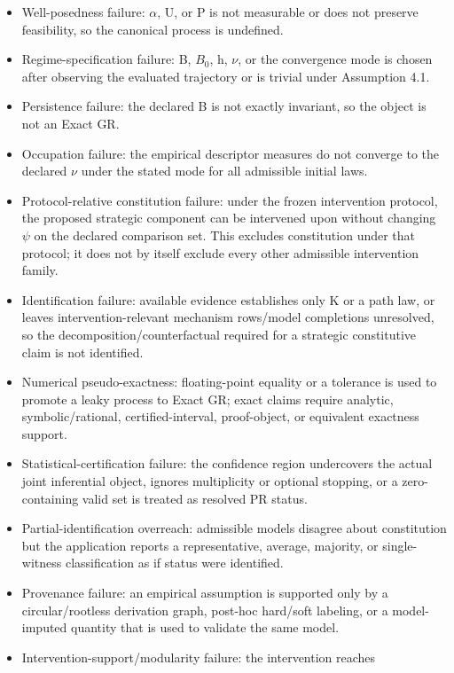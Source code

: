 \documentclass[10pt]{article}
\begin{document}
\begin{itemize}
\item
  Well-posedness failure: \(\alpha\), U, or P is not measurable or does
  not preserve feasibility, so the canonical process is undefined.
\item
  Regime-specification failure: B, \(B_0\), h, \(\nu\), or the
  convergence mode is chosen after observing the evaluated trajectory or
  is trivial under Assumption 4.1.
\item
  Persistence failure: the declared B is not exactly invariant, so the
  object is not an Exact GR.
\item
  Occupation failure: the empirical descriptor measures do not converge
  to the declared \(\nu\) under the stated mode for all admissible
  initial laws.
\item
  Protocol-relative constitution failure: under the frozen intervention
  protocol, the proposed strategic component can be intervened upon
  without changing \(\psi\) on the declared comparison set. This
  excludes constitution under that protocol; it does not by itself
  exclude every other admissible intervention family.
\item
  Identification failure: available evidence establishes only K or a
  path law, or leaves intervention-relevant mechanism rows/model
  completions unresolved, so the decomposition/counterfactual required
  for a strategic constitutive claim is not identified.
\item
  Numerical pseudo-exactness: floating-point equality or a tolerance is
  used to promote a leaky process to Exact GR; exact claims require
  analytic, symbolic/rational, certified-interval, proof-object, or
  equivalent exactness support.
\item
  Statistical-certification failure: the confidence region undercovers
  the actual joint inferential object, ignores multiplicity or optional
  stopping, or a zero-containing valid set is treated as resolved PR
  status.
\item
  Partial-identification overreach: admissible models disagree about
  constitution but the application reports a representative, average,
  majority, or single-witness classification as if status were
  identified.
\item
  Provenance failure: an empirical assumption is supported only by a
  circular/rootless derivation graph, post-hoc hard/soft labeling, or a
  model-imputed quantity that is used to validate the same model.
\item
  Intervention-support/modularity failure: the intervention reaches

\end{itemize}
\end{document}
